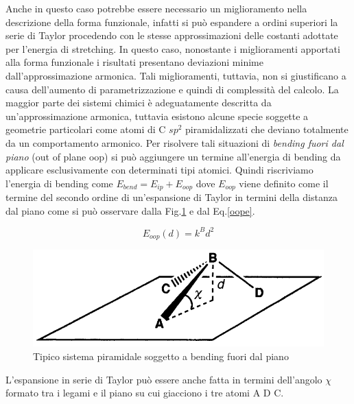 \documentclass[oneside]{amsbook}
\numberwithin{section}{chapter}
\numberwithin{equation}{section}
\numberwithin{figure}{section}
\begin{document}
Anche in questo caso potrebbe essere necessario un miglioramento nella descrizione della forma funzionale, infatti si può espandere a ordini superiori la serie di Taylor procedendo con le stesse approssimazioni delle costanti adottate per l'energia di stretching. In questo caso, nonostante i miglioramenti apportati alla forma funzionale i risultati presentano deviazioni minime dall'approssimazione armonica. Tali miglioramenti, tuttavia, non si giustificano a causa dell'aumento di parametrizzazione e quindi di complessità del calcolo.
La maggior parte dei sistemi chimici è adeguatamente descritta da un'approssimazione armonica, tuttavia esistono alcune specie soggette a geometrie particolari come atomi di C $sp^2$ piramidalizzati che deviano totalmente da un comportamento armonico. Per risolvere tali situazioni di \emph{bending fuori dal piano} (out of plane oop) si può aggiungere un termine all'energia di bending da applicare esclusivamente con determinati tipi atomici. Quindi riscriviamo l'energia di bending come $ E_{bend}=E_{ip}+E_{oop}$ dove $E_{oop}$ viene definito come il termine del secondo ordine di un'espansione di Taylor in termini della distanza dal piano come si può osservare dalla Fig.\ref{oopf} e dal Eq.\ref{oope}.

\begin{equation}
\label{oope}
E_{oop}(d)= k^Bd^2
\end{equation}

\begin{figure} [H]
\label{oopf}
\centering
\caption{Tipico sistema piramidale soggetto a bending fuori dal piano}
\includegraphics[scale=0.4]{oop}
\end{figure}
L'espansione in serie di Taylor può essere anche fatta in termini dell'angolo $\chi$ formato tra i legami e il piano su cui giacciono i tre atomi A D C. 
\end{document}
